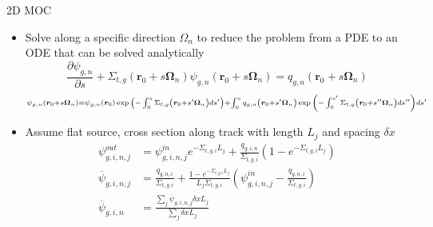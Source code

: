 
\begin{frame}[t]{2D MOC}

    \begin{itemize}
      \item Solve along a specific direction $\Omega_n$ to reduce the problem from a PDE to an ODE that can be solved analytically
      \begin{equation*}\scriptstyle
      \frac{\partial \psi_{g,n}}{\partial s} + \Sigma_{t,g}\left(\bm r_0 + 
      s\bm\Omega_n\right)\psi_{g,n}\left(\bm r_0 + s\bm\Omega_n\right) = 
      q_{g,n}\left(\bm r_0 + s\bm\Omega_n\right)
      \end{equation*}
      \begin{dmath*}\scriptstyle
        {\psi_{g,n}\left(\bm r_0 + s\bm\Omega_n\right) = \psi_{g,n}\left(\bm 
        r_0\right)\exp{\left(-\intop_0^s \Sigma_{t,g}\left(\bm r_0 + 
        s'\bm\Omega_n\right)ds'\right)}} + {\intop_0^s q_{g,n}\left(\bm r_0 + 
        s'\bm\Omega_n\right)\exp{\left(-\intop_0^{s'} \Sigma_{t,g}\left(\bm r_0 
        + s''\bm\Omega_n\right)ds''\right)}ds'}
      \end{dmath*}
  \item Assume flat source, cross section along track with 
length $L_j$ and spacing $\delta x$
\begin{align*}\scriptstyle
\psi^{out}_{g,i,n,j} &\scriptstyle = \psi^{in}_{g,i,n,j}e^{-\Sigma_{t,g,i} 
    L_j} + \frac{q_{g,i,n}}{\Sigma_{t,g,i}}\left(1 - 
e^{-\Sigma_{t,g,i}L_j}\right) \\\scriptstyle
\overline{\psi}_{g,i,n,j} &\scriptstyle = 
\frac{q_{g,n,i}}{\Sigma_{t,g,i}} + \frac{1 - e^{-\Sigma_{t,g,i} 
        L_j}}{L_j\Sigma_{t,g,i}}\left(\psi^{in}_{g,i,n,j} - 
\frac{q_{g,n,i}}{\Sigma_{t,g,i}}\right) \\\scriptstyle
\overline{\psi}_{g,i,n} &\scriptstyle = \frac{\sum_j 
    \overline{\psi}_{g,i,n,j} \delta x L_j}{\sum_j \delta x L_j}
\end{align*}
    \end{itemize}

\end{frame} 


